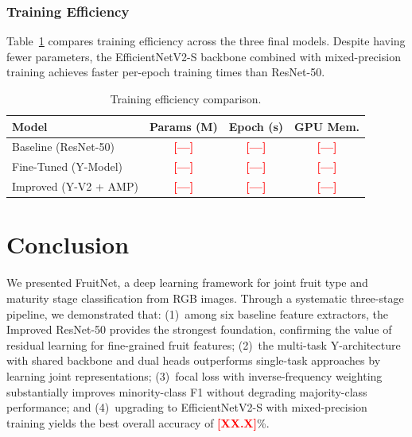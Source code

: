 \documentclass[10pt,twocolumn,letterpaper]{article}
\newcommand{\methodname}{FruitNet}
\newcommand{\placeholder}[1]{\textcolor{red}{\textbf{[#1]}}}
\begin{document}
\subsubsection{Training Efficiency}

Table~\ref{tab:efficiency} compares training efficiency across the three final models.
Despite having fewer parameters, the EfficientNetV2-S backbone combined with mixed-precision training achieves faster per-epoch training times than ResNet-50.

\begin{table}[H]
  \centering\small
  \caption{Training efficiency comparison.}
  \label{tab:efficiency}
  \begin{tabular}{lccc}
    \toprule
    \textbf{Model} & \textbf{Params (M)} & \textbf{Epoch (s)} & \textbf{GPU Mem.} \\
    \midrule
    Baseline (ResNet-50)  & \placeholder{—} & \placeholder{—} & \placeholder{—} \\
    Fine-Tuned (Y-Model)  & \placeholder{—} & \placeholder{—} & \placeholder{—} \\
    Improved (Y-V2 + AMP) & \placeholder{—} & \placeholder{—} & \placeholder{—} \\
    \bottomrule
  \end{tabular}
\end{table}

\section{Conclusion}
\label{sec:conclusion}

We presented \methodname{}, a deep learning framework for joint fruit type and maturity stage classification from RGB images.
Through a systematic three-stage pipeline, we demonstrated that:
(1)~among six baseline feature extractors, the Improved ResNet-50 provides the strongest foundation, confirming the value of residual learning for fine-grained fruit features;
(2)~the multi-task Y-architecture with shared backbone and dual heads outperforms single-task approaches by learning joint representations;
(3)~focal loss with inverse-frequency weighting substantially improves minority-class F1 without degrading majority-class performance;
and (4)~upgrading to EfficientNetV2-S with mixed-precision training yields the best overall accuracy of \placeholder{XX.X}\%.
\end{document}
